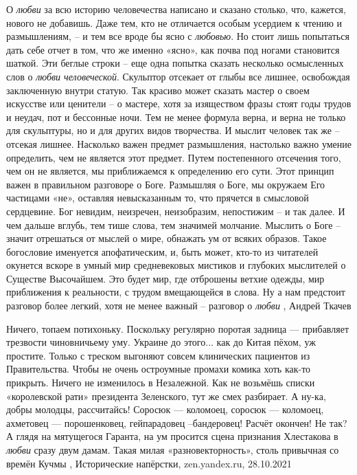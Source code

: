 О \emph{любви} за всю историю человечества написано и сказано столько, что, кажется,
нового не добавишь. Даже тем, кто не отличается особым усердием к чтению и
размышлениям, – и тем все вроде бы ясно с \emph{любовью}. Но стоит лишь попытаться
дать себе отчет в том, что же именно «ясно», как почва под ногами становится
шаткой.  Эти беглые строки – еще одна попытка сказать несколько осмысленных
слов о \emph{любви человеческой}.  Скульптор отсекает от глыбы все лишнее, освобождая
заключенную внутри статую.  Так красиво может сказать мастер о своем искусстве
или ценители – о мастере, хотя за изяществом фразы стоят годы трудов и неудач,
пот и бессонные ночи. Тем не менее формула верна, и верна не только для
скульптуры, но и для других видов творчества. И мыслит человек так же – отсекая
лишнее.  Насколько важен предмет размышления, настолько важно умение
определить, чем не является этот предмет. Путем постепенного отсечения того,
чем он не является, мы приближаемся к определению его сути.  Этот принцип важен
в правильном разговоре о Боге. Размышляя о Боге, мы окружаем Его частицами
«не», оставляя невысказанным то, что прячется в смысловой сердцевине. Бог
невидим, неизречен, неизобразим, непостижим – и так далее. И чем дальше вглубь,
тем тише слова, тем значимей молчание.  Мыслить о Боге – значит отрешаться от
мыслей о мире, обнажать ум от всяких образов. Такое богословие именуется
апофатическим, и, быть может, кто-то из читателей окунется вскоре в умный мир
средневековых мистиков и глубоких мыслителей о Существе Высочайшем. Это будет
мир, где отброшены ветхие одежды, мир приближения к реальности, с трудом
вмещающейся в слова.  Ну а нам предстоит разговор более легкий, хотя не менее
важный – разговор о \emph{любви}
, Андрей Ткачев

Ничего, топаем потихоньку. Поскольку регулярно поротая задница — прибавляет
трезвости чиновничьему уму. Украине до этого... как до Китая пёхом, уж простите.
Только с треском выгоняют совсем клинических пациентов из Правительства. Чтобы
не очень остроумные промахи комика хоть как-то прикрыть.  Ничего не изменилось
в Незалежной. Как не возьмёшь списки «королевской рати» президента Зеленского,
тут же смех разбирает. А ну-ка, добры молодцы, рассчитайсь! Соросюк — коломоец,
соросюк — коломоец, ахметовец — порошенковец, гейпарадовец –бандеровец! Расчёт
окончен! Не так? А глядя на мятущегося Гаранта, на ум просится сцена признания
Хлестакова в \emph{любви} сразу двум дамам. Такая милая «разновекторность», столь
привычная со времён Кучмы
, 
Исторические напёрстки, zen.yandex.ru, 28.10.2021
